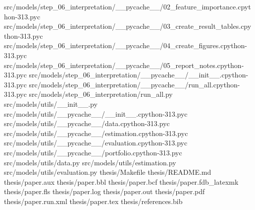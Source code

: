 \documentclass[
  11pt,
  a4paper]{article}
\newenvironment{Shaded}{}{}
\newcommand{\NormalTok}[1]{#1}
\begin{document}
\begin{Shaded}
\begin{Highlighting}[]
\NormalTok{src/models/step\_\allowbreak{}06\_\allowbreak{}interpretation/\_\allowbreak{}\_\allowbreak{}pycache\_\allowbreak{}\_\allowbreak{}/02\_\allowbreak{}feature\_\allowbreak{}importance.cpython{-}313.pyc}
\NormalTok{src/models/step\_\allowbreak{}06\_\allowbreak{}interpretation/\_\allowbreak{}\_\allowbreak{}pycache\_\allowbreak{}\_\allowbreak{}/03\_\allowbreak{}create\_\allowbreak{}result\_\allowbreak{}tables.cpython{-}313.pyc}
\NormalTok{src/models/step\_\allowbreak{}06\_\allowbreak{}interpretation/\_\allowbreak{}\_\allowbreak{}pycache\_\allowbreak{}\_\allowbreak{}/04\_\allowbreak{}create\_\allowbreak{}figures.cpython{-}313.pyc}
\NormalTok{src/models/step\_\allowbreak{}06\_\allowbreak{}interpretation/\_\allowbreak{}\_\allowbreak{}pycache\_\allowbreak{}\_\allowbreak{}/05\_\allowbreak{}report\_\allowbreak{}notes.cpython{-}313.pyc}
\NormalTok{src/models/step\_\allowbreak{}06\_\allowbreak{}interpretation/\_\allowbreak{}\_\allowbreak{}pycache\_\allowbreak{}\_\allowbreak{}/\_\allowbreak{}\_\allowbreak{}init\_\allowbreak{}\_\allowbreak{}.cpython{-}313.pyc}
\NormalTok{src/models/step\_\allowbreak{}06\_\allowbreak{}interpretation/\_\allowbreak{}\_\allowbreak{}pycache\_\allowbreak{}\_\allowbreak{}/run\_\allowbreak{}all.cpython{-}313.pyc}
\NormalTok{src/models/step\_\allowbreak{}06\_\allowbreak{}interpretation/run\_\allowbreak{}all.py}
\NormalTok{src/models/utils/\_\allowbreak{}\_\allowbreak{}init\_\allowbreak{}\_\allowbreak{}.py}
\NormalTok{src/models/utils/\_\allowbreak{}\_\allowbreak{}pycache\_\allowbreak{}\_\allowbreak{}/\_\allowbreak{}\_\allowbreak{}init\_\allowbreak{}\_\allowbreak{}.cpython{-}313.pyc}
\NormalTok{src/models/utils/\_\allowbreak{}\_\allowbreak{}pycache\_\allowbreak{}\_\allowbreak{}/data.cpython{-}313.pyc}
\NormalTok{src/models/utils/\_\allowbreak{}\_\allowbreak{}pycache\_\allowbreak{}\_\allowbreak{}/estimation.cpython{-}313.pyc}
\NormalTok{src/models/utils/\_\allowbreak{}\_\allowbreak{}pycache\_\allowbreak{}\_\allowbreak{}/evaluation.cpython{-}313.pyc}
\NormalTok{src/models/utils/\_\allowbreak{}\_\allowbreak{}pycache\_\allowbreak{}\_\allowbreak{}/portfolio.cpython{-}313.pyc}
\NormalTok{src/models/utils/data.py}
\NormalTok{src/models/utils/estimation.py}
\NormalTok{src/models/utils/evaluation.py}
\NormalTok{thesis/Makefile}
\NormalTok{thesis/README.md}
\NormalTok{thesis/paper.aux}
\NormalTok{thesis/paper.bbl}
\NormalTok{thesis/paper.bcf}
\NormalTok{thesis/paper.fdb\_\allowbreak{}latexmk}
\NormalTok{thesis/paper.fls}
\NormalTok{thesis/paper.log}
\NormalTok{thesis/paper.out}
\NormalTok{thesis/paper.pdf}
\NormalTok{thesis/paper.run.xml}
\NormalTok{thesis/paper.tex}
\NormalTok{thesis/references.bib}
\end{Highlighting}
\end{Shaded}
\end{document}

